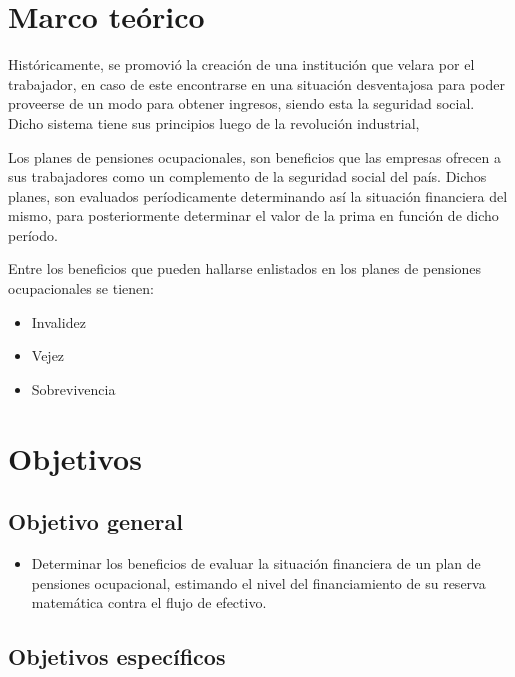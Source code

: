\documentclass[12pt,letterpaper,titlepage]{article}
\begin{document}
\section{Marco teórico}

Históricamente, se promovió la creación de una institución que velara por el trabajador, en caso de este encontrarse en una situación desventajosa para poder proveerse de un modo para obtener ingresos, siendo esta la seguridad social. Dicho sistema tiene sus principios luego de la revolución industrial, 

Los planes de pensiones ocupacionales, son beneficios que las empresas ofrecen a sus trabajadores como un complemento de la seguridad social del país. Dichos planes, son evaluados períodicamente determinando así la situación financiera del mismo, para posteriormente determinar el valor de la prima en función de dicho período. 

Entre los beneficios que pueden hallarse enlistados en los planes de pensiones ocupacionales se tienen:
\begin{itemize}
	\item Invalidez
	\item Vejez
	\item Sobrevivencia
\end{itemize}




\newpage

\section{Objetivos}


\subsection{Objetivo general}

\begin{itemize}
	\item Determinar los beneficios de evaluar la situación financiera de un plan de pensiones ocupacional, estimando el nivel del financiamiento de su reserva matemática contra el flujo de efectivo.
\end{itemize}


\subsection{Objetivos específicos}
\end{document}
